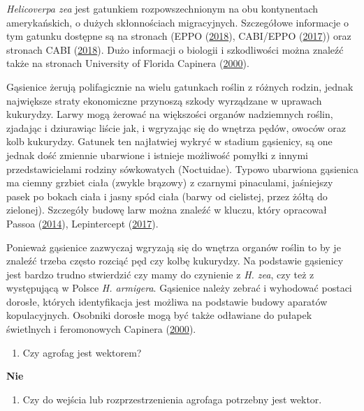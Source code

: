 \documentclass[polish,a4paper]{article}
\providecommand{\tightlist}{%
  \setlength{\itemsep}{0pt}\setlength{\parskip}{0pt}}
\begin{document}
\emph{Helicoverpa zea} jest gatunkiem rozpowszechnionym na obu
kontynentach amerykańskich, o dużych skłonnościach migracyjnych.
Szczegółowe informacje o tym gatunku dostępne są na stronach (EPPO
(\protect\hyperlink{ref-eppo2018}{2018}), CABI/EPPO
(\protect\hyperlink{ref-cabieppo2017}{2017})) oraz stronach CABI
(\protect\hyperlink{ref-cabi2017}{2018}). Dużo informacji o biologii i
szkodliwości można znaleźć także na stronach University of Florida
Capinera (\protect\hyperlink{ref-capinera2000}{2000}).

Gąsienice żerują polifagicznie na wielu gatunkach roślin z różnych
rodzin, jednak największe straty ekonomiczne przynoszą szkody wyrządzane
w uprawach kukurydzy. Larwy mogą żerować na większości organów
nadziemnych roślin, zjadając i dziurawiąc liście jak, i wgryzając się do
wnętrza pędów, owoców oraz kolb kukurydzy. Gatunek ten najłatwiej wykryć
w stadium gąsienicy, są one jednak dość zmiennie ubarwione i istnieje
możliwość pomyłki z innymi przedstawicielami rodziny sówkowatych
(Noctuidae). Typowo ubarwiona gąsienica ma ciemny grzbiet ciała (zwykle
brązowy) z czarnymi pinaculami, jaśniejszy pasek po bokach ciała i jasny
spód ciała (barwy od cielistej, przez żółtą do zielonej). Szczegóły
budowę larw można znaleźć w kluczu, który opracował Passoa
(\protect\hyperlink{ref-passoa2014}{2014}), Lepintercept
(\protect\hyperlink{ref-lepintercept2017}{2017}).

Ponieważ gąsienice zazwyczaj wgryzają się do wnętrza organów roślin to
by je znaleźć trzeba często rozciąć pęd czy kolbę kukurydzy. Na
podstawie gąsienicy jest bardzo trudno stwierdzić czy mamy do czynienie
z \emph{H. zea}, czy też z występującą w Polsce \emph{H. armigera}.
Gąsienice należy zebrać i wyhodować postaci dorosłe, których
identyfikacja jest możliwa na podstawie budowy aparatów kopulacyjnych.
Osobniki dorosłe mogą być także odławiane do pułapek świetlnych i
feromonowych Capinera (\protect\hyperlink{ref-capinera2000}{2000}).

\begin{enumerate}
\def\labelenumi{(\arabic{enumi})}
\setcounter{enumi}{2}
\tightlist
\item
  Czy agrofag jest wektorem?
\end{enumerate}

\textbf{Nie}

\begin{enumerate}
\def\labelenumi{(\arabic{enumi})}
\setcounter{enumi}{3}
\tightlist
\item
  Czy do wejścia lub rozprzestrzenienia agrofaga potrzebny jest wektor.
\end{enumerate}
\end{document}
